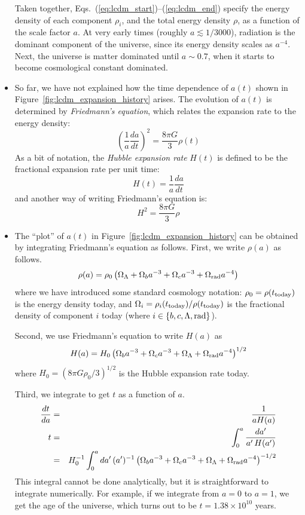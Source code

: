 \documentclass[aps,prd,superscriptaddress,groupedaddress,nofootinbib,nobibnotes]{revtex4}
\newcommand{\be}{\begin{equation}}
\newcommand{\ee}{\end{equation}}
\newcommand{\ba}{\begin{eqnarray}}
\newcommand{\ea}{\end{eqnarray}}
\newcommand{\nn}{\nonumber}
\begin{document}
\begin{itemize}
Taken together, Eqs.~(\ref{eq:lcdm_start})--(\ref{eq:lcdm_end}) specify the energy
density of each component $\rho_i$, and the total energy density $\rho$, as a 
function of the scale factor $a$.  At very early times (roughly $a \lesssim 1/3000$),
radiation is the dominant component of the universe, since its energy density scales
as $a^{-4}$.  Next, the universe is matter dominated until $a \sim 0.7$, when it starts
to become cosmological constant dominated.

\item
So far, we have not explained how the time dependence of $a(t)$ shown in Figure~\ref{fig:lcdm_expansion_history} arises.
The evolution of $a(t)$ is determined by {\em Friedmann's equation}, which relates the expansion rate to the energy density:
\be
\left( \frac{1}{a} \frac{da}{dt} \right)^2 = \frac{8\pi G}{3} \rho(t)
\ee
As a bit of notation, the {\em Hubble expansion rate} $H(t)$ is defined to be the fractional expansion rate per unit time:
\be
H(t) = \frac{1}{a} \frac{da}{dt}
\ee
and another way of writing Friedmann's equation is:
\be
H^2 = \frac{8\pi G}{3} \rho
\ee

\item
The ``plot'' of $a(t)$ in Figure~\ref{fig:lcdm_expansion_history} can be obtained by integrating
Friedmann's equation as follows.  First, we write $\rho(a)$ as follows.
\be
\rho(a) = \rho_0 \left( \Omega_\Lambda + \Omega_b a^{-3} + \Omega_c a^{-3} + \Omega_{\rm rad} a^{-4} \right)
\ee
where we have introduced some standard cosmology notation: $\rho_0 = \rho(t_{\rm today})$ is the
energy density today, and $\Omega_i = \rho_i(t_{\rm today}) / \rho(t_{\rm today})$ is the fractional
density of component $i$ today (where $i \in \{ b, c, \Lambda, {\rm rad} \}$).

Second, we use Friedmann's equation to write $H(a)$ as
\be
H(a) = H_0 \left( \Omega_b a^{-3} + \Omega_c a^{-3} + \Omega_\Lambda + \Omega_{\rm rad} a^{-4} \right)^{1/2}
\ee
where $H_0 = (8\pi G \rho_0 / 3)^{1/2}$ is the Hubble expansion rate today.

Third, we integrate to get $t$ as a function of $a$.
\ba
\frac{dt}{da} &=& \frac{1}{a H(a)} \\
t &=& \int_0^a \frac{da'}{a' \, H(a')} \nn \\
 &=& H_0^{-1} \int_0^a da' \, (a')^{-1} \left( \Omega_b a^{-3} + \Omega_c a^{-3} + \Omega_\Lambda + \Omega_{\rm rad} a^{-4} \right)^{-1/2}
\ea
This integral cannot be done analytically, but it is straightforward to integrate numerically.
For example, if we integrate from $a=0$ to $a=1$, we get the age of the universe, which turns out to be $t=1.38 \times 10^{10}$ years.


\end{itemize}
\end{document}
